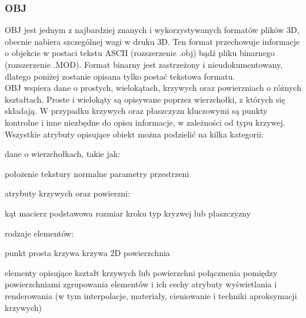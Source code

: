 \subsubsection{OBJ}
OBJ jest jednym z najbardziej znanych i wykorzystywanych formatów plików 3D, obecnie nabiera szczególnej wagi w druku 3D. Ten format przechowuje informacje o objekcie w postaci tekstu ASCII (rozszerzenie .obj) bądź pliku binarnego (rozszerzenie .MOD)\cite{obj}.
Format binarny jest zastrzeżony i nieudokumentowany, dlatego poniżej zostanie opisana tylko postać tekstowa formatu.\\
OBJ wspiera dane o prostych, wielokątach, krzywych oraz powierzniach o różnych kształtach. Proste i wielokąty są opisywane poprzez wierzchołki, z których się składają. W przypadku krzywych oraz płaszczyzn kluczowymi są punkty kontrolne i inne niezbędne do opisu informacje, w zależności od typu krzywej. \\
Wszystkie atrybuty opisujące obiekt można podzielić na kilka kategorii: 
\begin{itemize}
\itemi dane o wierzchołkach, takie jak: 
	\begin{itemize}
	\itemii położenie
	\itemii	tekstury
	\itemii	normalne
	\itemii	parametry przestrzeni 
	\end{itemize}
\itemi atrybuty krzywych oraz powierzni:
	\begin{itemize}
	\itemii kąt
	\itemii macierz podstawowa
	\itemii rozmiar kroku
	\itemii typ kryzwej lub płaszczyzny
	\end{itemize}
\itemi rodzaje elementów:
	\begin{itemize}
	\itemii punkt
	\itemii prosta
	\itemii krzywa
	\itemii krzywa 2D
	\itemii powierzchnia
	\end{itemize}
\itemi elementy opisujące kształt krzywych lub powierzchni
\itemi połącznenia pomiędzy powierzchniami
\itemi zgrupowania elementów i ich cechy
\itemi atrybuty wyświetlania i renderowania (w tym interpolacje, materiały, cieniowanie i techniki aproksymacji krzywych)
\end{itemize}

